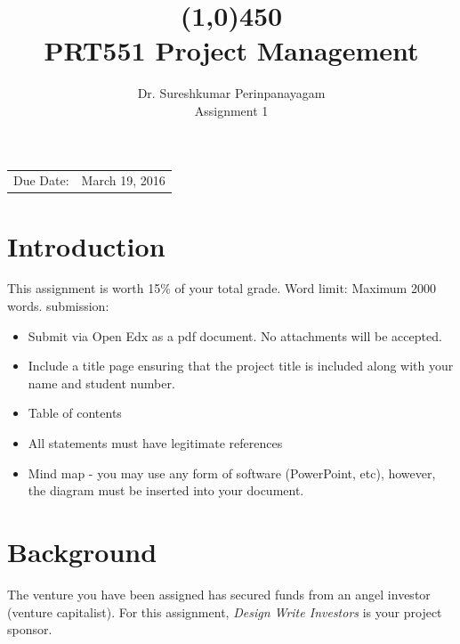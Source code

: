 \documentclass[12pt]{article}
\begin{document}
 
\title{\line(1,0){450}\\PRT551 Project Management}%
\author{Dr. Sureshkumar Perinpanayagam \\ %
Assignment 1} %
\date{}
\maketitle

\begin{center}
\begin{tabular}{l r}
Due Date: & March 19, 2016 \\
\end{tabular}
\end{center}
 
\section{Introduction}
This assignment is worth 15\% of your total grade. Word limit: Maximum 2000 words. submission:
\begin{itemize}
	\item Submit via Open Edx as a pdf document. No attachments will be accepted.
	\item Include a title page ensuring that the project title is included along with your name and student number.
	\item Table of contents
	\item All statements must have legitimate references
	\item Mind map - you may use any form of software (PowerPoint, etc), however, the diagram must be inserted into your document. 
\end{itemize}
 
\section{Background}
The venture you have been assigned has secured funds from an angel investor (venture capitalist). For this assignment, \textit{Design Write Investors} is your project sponsor.\\ 
\end{document}
